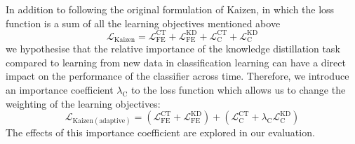 In addition to following the original formulation of Kaizen, in which the loss function is a sum of all the learning objectives mentioned above 
\[
 \mathcal{L_\mathrm{Kaizen}} =\mathcal{L}^{\mathrm{CT}}_{\mathrm{FE}} + \mathcal{L}^{\mathrm{KD}}_{\mathrm{FE}} + \mathcal{L}^{\mathrm{CT}}_{\mathrm{C}} + \mathcal{L}^{\mathrm{KD}}_{\mathrm{C}}
\]
we hypothesise that the relative importance of the knowledge distillation task compared to learning from new data in classification learning can have a direct impact on the performance of the classifier across time. Therefore, we introduce an importance coefficient $\lambda_{\mathrm{C}}$ to the loss function which allows us to change the weighting of the learning objectives:
\[
 \mathcal{L_\mathrm{Kaizen(adaptive)}} =(\mathcal{L}^{\mathrm{CT}}_{\mathrm{FE}} + \mathcal{L}^{\mathrm{KD}}_{\mathrm{FE}}) + (\mathcal{L}^{\mathrm{CT}}_{\mathrm{C}} + \lambda_{\mathrm{C}} \mathcal{L}^{\mathrm{KD}}_{\mathrm{C}})
\]
The effects of this importance coefficient are explored in our evaluation.

